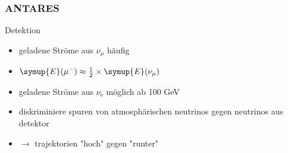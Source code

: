 \documentclass[aspectratio=1610, 9pt]{beamer}
\begin{document}
\begin{frame}\frametitle{ANTARES}
  \begin{block}{Detektion}
    \begin{itemize}
      \item geladene Str\"ome aus $\nu_{\mu}$ h\"aufig
      \item $\symup{E}(\mu^{-}) \approx \frac{1}{2}\times \symup{E}(\nu_{\mu})$
      \item geladene Str\"ome aus $\nu_{\text{e}}$ m\"oglich ab 100 GeV %
      \item diskriminiere spuren von atmosph\"arischen neutrinos gegen neutrinos aus detektor
      \item $\to$ trajektorien "hoch" gegen "runter"
    \end{itemize}
  \end{block}
\end{frame}
\end{document}

